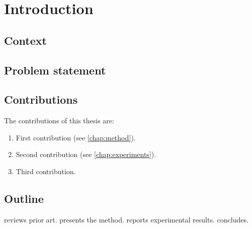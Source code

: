 \chapter{Introduction}
\label{chap:introduction}

\section{Context}
\label{sec:intro:context}


\section{Problem statement}
\label{sec:intro:problem}


\section{Contributions}
\label{sec:intro:contributions}

The contributions of this thesis are:
\begin{enumerate}
  \item First contribution (see \cref{chap:method}).
  \item Second contribution (see \cref{chap:experiments}).
  \item Third contribution.
\end{enumerate}

\section{Outline}
\label{sec:intro:outline}

 reviews prior art.
 presents the method.
 reports experimental results.
 concludes.
